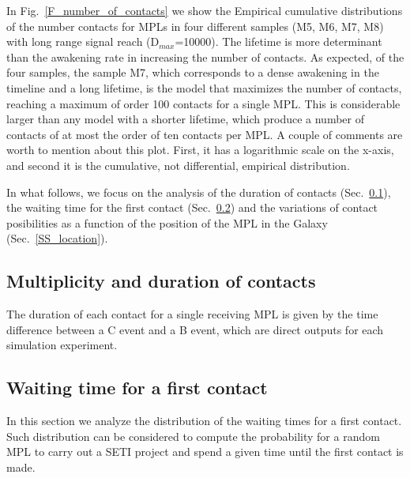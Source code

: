 In Fig.~\ref{F_number_of_contacts} we show the Empirical cumulative
distributions of the number contacts for MPLs in four different
samples (M5, M6, M7, M8) with long range signal reach
(D$_{max}$=10000). 
%
The lifetime is more determinant than the awakening rate in increasing
the number of contacts.
%
As expected, of the four samples, the sample M7, which corresponds to
a dense awakening in the timeline and a long lifetime, is the model
that maximizes the number of contacts, reaching a maximum of order 100
contacts for a single MPL.
%
This is considerable larger than any model with a shorter lifetime,
which produce a number of contacts of at most the order of ten
contacts per MPL.
%
A couple of comments are worth to mention about this plot.
%
First, it has a logarithmic scale on the x-axis, and second it is the
cumulative, not differential, empirical distribution.
 

In what follows, we focus on the analysis of the duration of contacts
(Sec.~\ref{SS_multiplicity}), the waiting time for the first contact
(Sec.~\ref{SS_waiting}) and the
variations of contact posibilities as a function of the position of
the MPL in the Galaxy (Sec.~\ref{SS_location}).




\subsection{Multiplicity and duration of contacts}\label{SS_multiplicity}

The duration of each contact for a single receiving MPL is given by the
time difference between a C event and a B event, which are direct
outputs for each simulation experiment.





\subsection{Waiting time for a first contact}\label{SS_waiting}

In this section we analyze the distribution of the waiting times for
a first contact.
%
Such distribution can be considered to compute the probability for a
random MPL to carry out a SETI project and spend a given time until
the first contact is made. 


